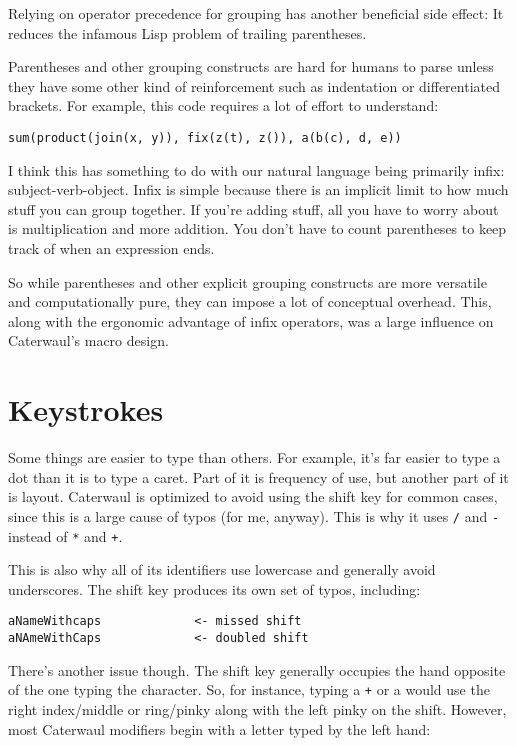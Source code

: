 \documentclass{report}
\begin{document}
    Relying on operator precedence for grouping has another beneficial side effect: It reduces the infamous Lisp problem of trailing parentheses.

    Parentheses and other grouping constructs are hard for humans to parse unless they have some other kind of reinforcement such as indentation or differentiated brackets. For example, this
    code requires a lot of effort to understand:

\begin{verbatim}
sum(product(join(x, y)), fix(z(t), z()), a(b(c), d, e))
\end{verbatim}

    I think this has something to do with our natural language being primarily infix: subject-verb-object. Infix is simple because there is an implicit limit to how much stuff you can group
    together. If you're adding stuff, all you have to worry about is multiplication and more addition. You don't have to count parentheses to keep track of when an expression ends.

    So while parentheses and other explicit grouping constructs are more versatile and computationally pure, they can impose a lot of conceptual overhead. This, along with the ergonomic
    advantage of infix operators, was a large influence on Caterwaul's macro design.

\section{Keystrokes}
    Some things are easier to type than others. For example, it's far easier to type a dot than it is to type a caret. Part of it is frequency of use, but another part of it is layout.
    Caterwaul is optimized to avoid using the shift key for common cases, since this is a large cause of typos (for me, anyway). This is why it uses \verb|/| and \verb|-| instead of \verb|*|
    and \verb|+|.

    This is also why all of its identifiers use lowercase and generally avoid underscores. The shift key produces its own set of typos, including:

\begin{verbatim}
aNameWithcaps             <- missed shift
aNAmeWithCaps             <- doubled shift
\end{verbatim}

    There's another issue though. The shift key generally occupies the hand opposite of the one typing the character. So, for instance, typing a {\tt +} or a {\tt *} would use the right
    index/middle or ring/pinky along with the left pinky on the shift. However, most Caterwaul modifiers begin with a letter typed by the left hand:
\end{document}
